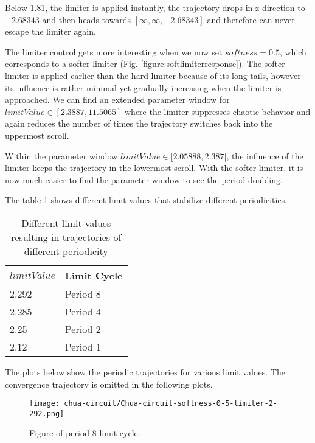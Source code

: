 \documentclass[main]{subfiles}
\begin{document}
Below 1.81, the limiter is applied instantly, the trajectory drops in z direction to \(-2.68343\) and then heads towards \([\infty,\infty,-2.68343]\) and therefore can never escape the limiter again.


The limiter control gets more interesting when we now set \(softness=0.5\), which corresponds to a softer limiter (Fig. \ref{figure:softlimiterresponse}). The softer limiter is applied earlier than the hard limiter because of its long tails, however its influence is rather minimal yet gradually increasing when the limiter is approached. We can find an extended parameter window for \(limitValue \in [2.3887,11.5065]\) where the limiter suppresses chaotic behavior and again reduces the number of times the trajectory switches back into the uppermost scroll.

Within the parameter window \(limitValue \in [2.05888,2.387[\), the influence of the limiter keeps the trajectory in the lowermost scroll. With the softer limiter, it is now much easier to find the parameter window to see the period doubling. 

The table \ref{table:periodicities} shows different limit values that stabilize different periodicities.

\begin{table}[H]
\renewcommand{\arraystretch}{1.2}
\center
\begin{tabular}{@{}ll@{}}
	\toprule
   \(limitValue\) & Limit Cycle\\
   \midrule
   2.292 & Period 8 \\ 
   2.285 & Period 4 \\
   2.25  & Period 2 \\
   2.12 & Period 1 \\
   \bottomrule
\end{tabular}
\caption{Different limit values resulting in trajectories of different periodicity}
\label{table:periodicities}
\end{table}


The plots below show the periodic trajectories for various limit values. The convergence trajectory is omitted in the following plots.


\begin{figure}[H]
\centering
\texttt{[image: chua-circuit/Chua-circuit-softness-0-5-limiter-2-292.png]}
\caption[Figure of period 8 limit cycle]{Figure of period 8 limit cycle.}
\label{figure:chaotictrajectories}
\end{figure}
\end{document}
